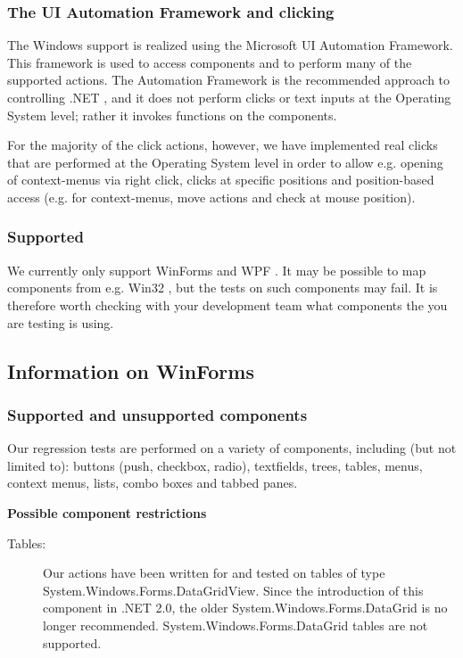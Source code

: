 \subsubsection{The UI Automation Framework and clicking}

The Windows support is realized using the Microsoft UI Automation Framework. This framework is used to access components and to perform many of the supported actions. The Automation Framework is the recommended approach to controlling .NET \gdauts{}, and it does not perform clicks or text inputs at the Operating System level; rather it invokes functions on the components. 

For the majority of the click actions, however, we have implemented real clicks that are performed at the Operating System level in order to allow e.g. opening of context-menus via right click, clicks at specific positions and position-based access (e.g. for context-menus, move actions and check at mouse position).   

\subsubsection{Supported \gdauts{}}
We currently only support WinForms and WPF \gdauts{}. It may be possible to map components from e.g. Win32 \gdauts{}, but the tests on such components may fail. It is therefore worth checking with your development team what components the \gdaut{} you are testing is using. 

\subsection{Information on WinForms \gdauts{}}
\subsubsection{Supported and unsupported components}
Our regression tests are performed on a variety of components, including (but not limited to): buttons (push, checkbox, radio), textfields, trees, tables, menus, context menus, lists, combo boxes and tabbed panes. 

\textbf{Possible component restrictions}
\begin{description}
\item [Tables:]{Our actions have been written for and tested on tables of type System.Windows.Forms.DataGridView. Since the introduction of this component in .NET 2.0, the older System.Windows.Forms.DataGrid is no longer recommended. System.Windows.Forms.DataGrid tables are not supported.}
\end{description}

